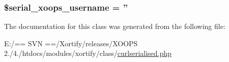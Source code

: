 \hypertarget{class_c_u_r_l_s_e_r_i_a_l_i_s_e_d_xortify_exchange_a276a5744b88de586eb05b0dce0f6873d}{
\subsubsection[{\$serial\-\_\-xoops\-\_\-username}]{\setlength{\rightskip}{0pt plus 5cm}\$serial\-\_\-xoops\-\_\-username = ''}}\label{class_c_u_r_l_s_e_r_i_a_l_i_s_e_d_xortify_exchange_a276a5744b88de586eb05b0dce0f6873d}


The documentation for this class was generated from the following file\-:\begin{DoxyCompactItemize}
\item 
E\-:/== S\-V\-N ==/\-Xortify/releases/\-X\-O\-O\-P\-S 2./4./htdocs/modules/xortify/class/\hyperlink{curlserialised_8php}{curlserialised.\-php}\end{DoxyCompactItemize}
